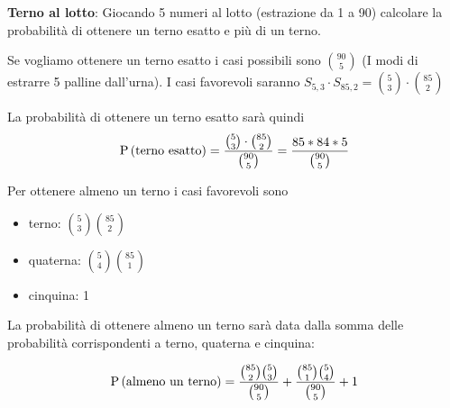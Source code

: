 \begin{exrc}
	\textbf{Terno al lotto}: Giocando 5 numeri al lotto (estrazione da 1 a 90) calcolare la probabilità di ottenere un terno esatto e più di un terno.
	
	Se vogliamo ottenere un terno esatto i casi possibili sono $ \binom{90}{5} $ (I modi di estrarre 5 palline dall'urna). I casi favorevoli saranno $ S_{5,3} \cdot S_{85,2} = \binom{5}{3} \cdot \binom{85}{2}$
	
	La probabilità di ottenere un terno esatto sarà quindi
	\begin{equation*}
		\text{P}\left(\text{terno esatto}\right) = \dfrac{\binom{5}{3} \cdot \binom{85}{2}}{\binom{90}{5}} = \dfrac{85 * 84 * 5}{\binom{90}{5}}
	\end{equation*}
	
	Per ottenere almeno un terno i casi favorevoli sono
	\begin{itemize}
		\item terno: $ \binom{5}{3} \binom{85}{2} $
		\item quaterna: $ \binom{5}{4} \binom{85}{1} $
		\item cinquina: 1
	\end{itemize}
	
	La probabilità di ottenere almeno un terno sarà data dalla somma delle probabilità corrispondenti a terno, quaterna e cinquina:
	
	\begin{equation*}
		\text{P}\left(\text{almeno un terno}\right) = \dfrac{\binom{85}{2} \binom{5}{3}}{\binom{90}{5}} + \dfrac{\binom{85}{1} \binom{5}{4}}{\binom{90}{5}} + 1
	\end{equation*}
\end{exrc}

